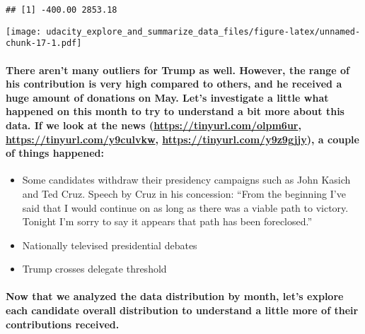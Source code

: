\documentclass[]{article}
\providecommand{\tightlist}{%
  \setlength{\itemsep}{0pt}\setlength{\parskip}{0pt}}
\let\oldparagraph\paragraph
\renewcommand{\paragraph}[1]{\oldparagraph{#1}\mbox{}}
\begin{document}
\begin{verbatim}
## [1] -400.00 2853.18
\end{verbatim}

\texttt{[image: udacity\_explore\_and\_summarize\_data\_files/figure-latex/unnamed-chunk-17-1.pdf]}

\paragraph{\texorpdfstring{There aren't many outliers for Trump as well.
However, the range of his contribution is very high compared to others,
and he received a huge amount of donations on May. Let's investigate a
little what happened on this month to try to understand a bit more about
this data. If we look at the news (\url{https://tinyurl.com/olpm6ur},
\url{https://tinyurl.com/y9culvkw}, \url{https://tinyurl.com/y9z9gjjy}),
a couple of things
happened:}{There aren't many outliers for Trump as well. However, the range of his contribution is very high compared to others, and he received a huge amount of donations on May. Let's investigate a little what happened on this month to try to understand a bit more about this data. If we look at the news (https://tinyurl.com/olpm6ur, https://tinyurl.com/y9culvkw, https://tinyurl.com/y9z9gjjy), a couple of things happened:}}\label{there-arent-many-outliers-for-trump-as-well.-however-the-range-of-his-contribution-is-very-high-compared-to-others-and-he-received-a-huge-amount-of-donations-on-may.-lets-investigate-a-little-what-happened-on-this-month-to-try-to-understand-a-bit-more-about-this-data.-if-we-look-at-the-news-httpstinyurl.comolpm6ur-httpstinyurl.comy9culvkw-httpstinyurl.comy9z9gjjy-a-couple-of-things-happened}

\begin{itemize}
\tightlist
\item
  Some candidates withdraw their presidency campaigns such as John
  Kasich and Ted Cruz. Speech by Cruz in his concession: ``From the
  beginning I've said that I would continue on as long as there was a
  viable path to victory. Tonight I'm sorry to say it appears that path
  has been foreclosed.''
\item
  Nationally televised presidential debates
\item
  Trump crosses delegate threshold
\end{itemize}

\paragraph{Now that we analyzed the data distribution by month, let's
explore each candidate overall distribution to understand a little more
of their contributions
received.}\label{now-that-we-analyzed-the-data-distribution-by-month-lets-explore-each-candidate-overall-distribution-to-understand-a-little-more-of-their-contributions-received.}
\end{document}
